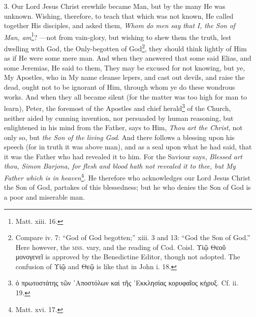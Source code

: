 3. Our Lord Jesus Christ erewhile became Man, but by the many He was unknown. Wishing, therefore, to teach that which was not known, He called together His disciples, and asked them, \emph{Whom do men say that I, the Son of Man, am}\footnote{Matt. xiii. 16.}? —not from vain-glory, but wishing to shew them the truth, lest dwelling with God, the Only-begotten of God\footnote{Compare iv. 7: “God of God begotten;” xiii. 3 and 13: “God the Son of God.” Here however, the \textsc{mss.} vary, and the reading of Cod. Coisl. \textgreek{Υἱῷ Θεοῦ μονογενεῖ} is approved by the Benedictine Editor, though not adopted. The confusion of \textgreek{Υἱῷ} and \textgreek{Θεῷ} is like that in John i. 18.}, they should think lightly of Him as if He were some mere man. And when they answered that some said Elias, and some Jeremias, He said to them, They may be excused for not knowing, but ye, My Apostles, who in My name cleanse lepers, and cast out devils, and raise the dead, ought not to be ignorant of Him, through whom ye do these wondrous works. And when they all became silent (for the matter was too high for man to learn), Peter, the foremost of the Apostles and chief herald\footnote{\textgreek{ὁ πρωτοστάτης τῶν ᾽Αποστόλων καὶ τῆς ᾽Εκκλησίας κορυφαῖος κήρυξ}. Cf. ii. 19.} of the Church, neither aided by cunning invention, nor persuaded by human reasoning, but enlightened in his mind from the Father, says to Him, \emph{Thou art the Christ}, not only so, but \emph{the Son of the living God}. And there follows a blessing upon his speech (for in truth it was above man), and as a seal upon what he had said, that it was the Father who had revealed it to him. For the Saviour says, \emph{Blessed art thou, Simon Barjona, for flesh and blood hath not revealed it to thee, but My Father which is in heaven}\footnote{Matt. xvi. 17.}. He therefore who acknowledges our Lord Jesus Christ the Son of God, partakes of this blessedness; but he who denies the Son of God is a poor and miserable man.

